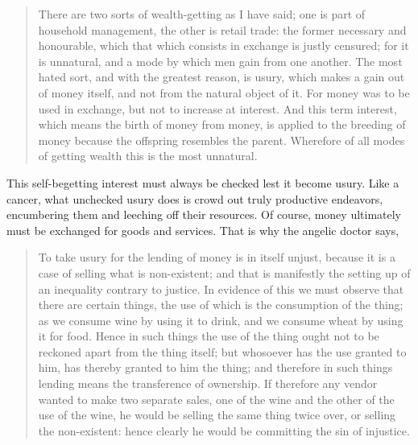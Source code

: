 \documentclass[letterpaper]{article}
\begin{document}
\begin{quote}
  There are two sorts of wealth-getting as I have said; one is part of household management, the other is retail trade: the former necessary and honourable, which that which consists in exchange is justly censured; for it is unnatural, and a mode by which men gain from one another. The most hated sort, and with the greatest reason, is usury, which makes a gain out of money itself, and not from the natural object of it. For money was to be used in exchange, but not to increase at interest. And this term interest, which means the birth of money from money, is applied to the breeding of money because the offspring resembles the parent. Wherefore of all modes of getting wealth this is the most unnatural.
\end{quote}

This self-begetting interest must always be checked lest it become usury. Like a cancer, what unchecked usury does is crowd out truly productive endeavors, encumbering them and leeching off their resources. Of course, money ultimately must be exchanged for goods and services. That is why the angelic doctor says,

\begin{quote}
  To take usury for the lending of money is in itself unjust, because it is a case of selling what is non-existent; and that is manifestly the setting up of an inequality contrary to justice. In evidence of this we must observe that there are certain things, the use of which is the consumption of the thing; as we consume wine by using it to drink, and we consume wheat by using it for food. Hence in such things the use of the thing ought not to be reckoned apart from the thing itself; but whosoever has the use granted to him, has thereby granted to him the thing; and therefore in such things lending means the transference of ownership. If therefore any vendor wanted to make two separate sales, one of the wine and the other of the use of the wine, he would be selling the same thing twice over, or selling the non-existent: hence clearly he would be committing the sin of injustice.
\end{quote}

\end{document}
